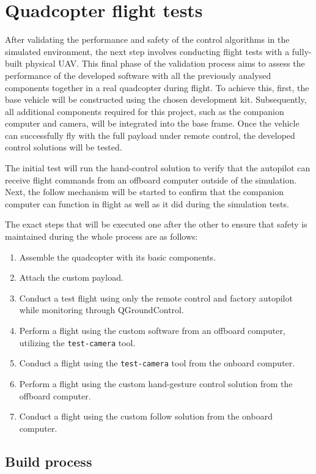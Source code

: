 \section{Quadcopter flight tests}

After validating the performance and safety of the control algorithms in the simulated environment, the next step involves conducting flight tests with a fully-built physical UAV. This final phase of the validation process aims to assess the performance of the developed software with all the previously analysed components together in a real quadcopter during flight. To achieve this, first, the base vehicle will be constructed using the chosen development kit. Subsequently, all additional components required for this project, such as the companion computer and camera, will be integrated into the base frame. Once the vehicle can successfully fly with the full payload under remote control, the developed control solutions will be tested.

The initial test will run the hand-control solution to verify that the autopilot can receive flight commands from an offboard computer outside of the simulation. Next, the follow mechanism will be started to confirm that the companion computer can function in flight as well as it did during the simulation tests.

The exact steps that will be executed one after the other to ensure that safety is maintained during the whole process are as follows:
\begin{enumerate}
    \item Assemble the quadcopter with its basic components.
    \item Attach the custom payload.
    \item Conduct a test flight using only the remote control and factory autopilot while monitoring through QGroundControl.
    \item Perform a flight using the custom software from an offboard computer, utilizing the \texttt{test-camera} tool.
    \item Conduct a flight using the \texttt{test-camera} tool from the onboard computer.
    \item Perform a flight using the custom hand-gesture control solution from the offboard computer.
    \item Conduct a flight using the custom follow solution from the onboard computer.
\end{enumerate}


\subsection{Build process}
\label{sec:test-7-builddrone}

